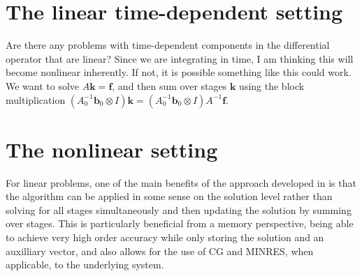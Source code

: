 \documentclass[review]{siamart}
\begin{document}


\section{The linear time-dependent setting}

{\color{blue}
Are there any problems with time-dependent components in the differential
operator that are linear? Since we are integrating in time, I am thinking
this will become nonlinear inherently. If not, it is possible something like
this could work. We want to solve $A\mathbf{k} = \mathbf{f}$, and then sum
over stages $\mathbf{k}$ using the block multiplication
$(A_0^{-1}\mathbf{b}_0\otimes I)\mathbf{k} = 
(A_0^{-1}\mathbf{b}_0\otimes I)A^{-1}\mathbf{f}$. 

}

\section{The nonlinear setting}\label{sec:nonlinear}

For linear problems, one of the main benefits of the approach developed in 
is that the algorithm can be applied in some sense on the solution level rather than
solving for all stages simultaneously and then updating the solution by summing over stages.
This is particularly beneficial from a memory perspective, being able to achieve very
high order accuracy while only storing the solution and an auxilliary vector, and also allows
for the use of CG and MINRES, when applicable, to the underlying system.
\end{document}
